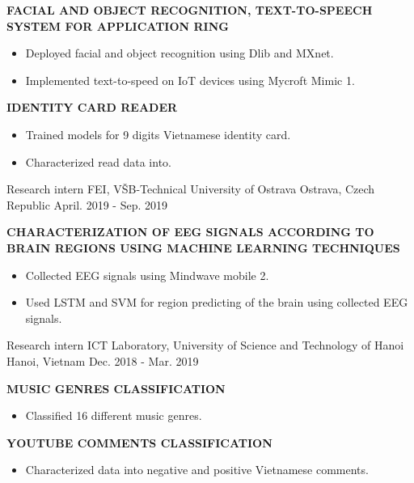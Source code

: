 \begin{cventries}
{\begin{cvitems}
        \item {\textbf{FACIAL AND OBJECT RECOGNITION, TEXT-TO-SPEECH SYSTEM FOR APPLICATION RING}
                \begin{itemize}
                  \item Deployed facial and object recognition using Dlib and MXnet.
                  \item Implemented text-to-speed on IoT devices using Mycroft Mimic 1.
                \end{itemize}}
        \item {\textbf{IDENTITY CARD READER}
                \begin{itemize}
                  \item Trained models for 9 digits Vietnamese identity card.
                  \item Characterized read data into. 
                \end{itemize}}
      \end{cvitems}
    }

  \cventry
    {Research intern} %
    {FEI, VŠB-Technical University of Ostrava} %
    {Ostrava, Czech Republic} %
    {April. 2019 - Sep. 2019} %
    {
      \begin{cvitems} %
        \item {\textbf{CHARACTERIZATION OF EEG SIGNALS ACCORDING TO BRAIN REGIONS USING MACHINE LEARNING TECHNIQUES}
                \begin{itemize}
                  \item Collected EEG signals using Mindwave mobile 2.
                  \item Used LSTM and SVM for region predicting of the brain using collected EEG signals.
                \end{itemize}}
      \end{cvitems}
    }

  \cventry
    {Research intern} %
    {ICT Laboratory, University of Science and Technology of Hanoi} %
    {Hanoi, Vietnam} %
    {Dec. 2018 - Mar. 2019} %
    {
      \begin{cvitems} %
        \item {\textbf{MUSIC GENRES CLASSIFICATION}
                \begin{itemize}
                  \item Classified 16 different music genres.
                \end{itemize}}
        \item {\textbf{YOUTUBE COMMENTS CLASSIFICATION}
                \begin{itemize}
                  \item Characterized data into negative and positive Vietnamese comments.
                \end{itemize}}
      \end{cvitems}
    }


\end{cventries}

